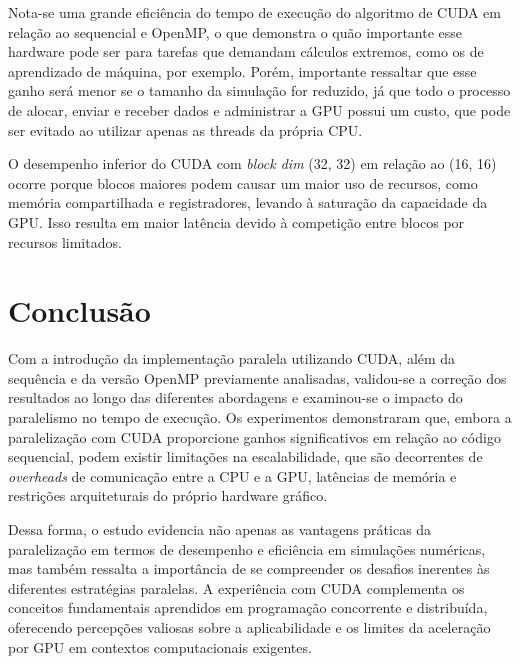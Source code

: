 \documentclass[12pt]{article}
\begin{document}
Nota-se uma grande eficiência do tempo de execução do algoritmo de CUDA em
relação ao sequencial e OpenMP, o que demonstra o quão importante esse hardware
pode ser para tarefas que demandam cálculos extremos, como os de aprendizado de
máquina, por exemplo. Porém, importante ressaltar que esse ganho será menor se
o tamanho da simulação for reduzido, já que todo o processo de alocar, enviar e
receber dados e administrar a GPU possui um custo, que pode ser evitado ao
utilizar apenas as threads da própria CPU\@.

O desempenho inferior do CUDA com \textit{block dim} (32, 32) em relação ao
(16, 16) ocorre porque blocos maiores podem causar um maior uso de recursos,
como memória compartilhada e registradores, levando à saturação da capacidade
da GPU\@. Isso resulta em maior latência devido à competição entre blocos por
recursos limitados.

\section{Conclusão}

Com a introdução da implementação paralela utilizando CUDA, além da sequência e
da versão OpenMP previamente analisadas, validou-se a correção dos resultados
ao longo das diferentes abordagens e examinou-se o impacto do paralelismo no
tempo de execução. Os experimentos demonstraram que, embora a paralelização com
CUDA proporcione ganhos significativos em relação ao código sequencial, podem
existir limitações na escalabilidade, que são decorrentes de \textit{overheads}
de comunicação entre a CPU e a GPU, latências de memória e restrições
arquiteturais do próprio hardware gráfico.

Dessa forma, o estudo evidencia não apenas as vantagens práticas da
paralelização em termos de desempenho e eficiência em simulações numéricas, mas
também ressalta a importância de se compreender os desafios inerentes às
diferentes estratégias paralelas. A experiência com CUDA complementa os
conceitos fundamentais aprendidos em programação concorrente e distribuída,
oferecendo percepções valiosas sobre a aplicabilidade e os limites da
aceleração por GPU em contextos computacionais exigentes.



\nocite{*}
\end{document}
